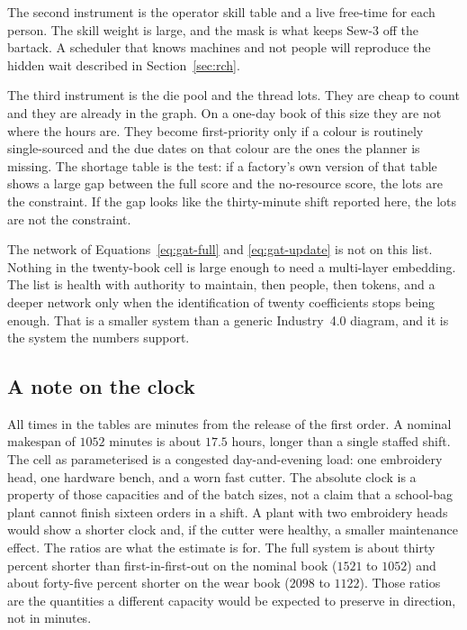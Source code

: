The second instrument is the operator skill table and a live free-time for each person. The skill weight is large, and the mask is what keeps Sew-3 off the bartack. A scheduler that knows machines and not people will reproduce the hidden wait described in Section~\ref{sec:rch}.

The third instrument is the die pool and the thread lots. They are cheap to count and they are already in the graph. On a one-day book of this size they are not where the hours are. They become first-priority only if a colour is routinely single-sourced and the due dates on that colour are the ones the planner is missing. The shortage table is the test: if a factory's own version of that table shows a large gap between the full score and the no-resource score, the lots are the constraint. If the gap looks like the thirty-minute shift reported here, the lots are not the constraint.

The network of Equations~\eqref{eq:gat-full} and \eqref{eq:gat-update} is not on this list. Nothing in the twenty-book cell is large enough to need a multi-layer embedding. The list is health with authority to maintain, then people, then tokens, and a deeper network only when the identification of twenty coefficients stops being enough. That is a smaller system than a generic Industry~4.0 diagram, and it is the system the numbers support.

\subsection{A note on the clock}

All times in the tables are minutes from the release of the first order. A nominal makespan of \(1052\) minutes is about \(17.5\) hours, longer than a single staffed shift. The cell as parameterised is a congested day-and-evening load: one embroidery head, one hardware bench, and a worn fast cutter. The absolute clock is a property of those capacities and of the batch sizes, not a claim that a school-bag plant cannot finish sixteen orders in a shift. A plant with two embroidery heads would show a shorter clock and, if the cutter were healthy, a smaller maintenance effect. The ratios are what the estimate is for. The full system is about thirty percent shorter than first-in-first-out on the nominal book (\(1521\) to \(1052\)) and about forty-five percent shorter on the wear book (\(2098\) to \(1122\)). Those ratios are the quantities a different capacity would be expected to preserve in direction, not in minutes.

